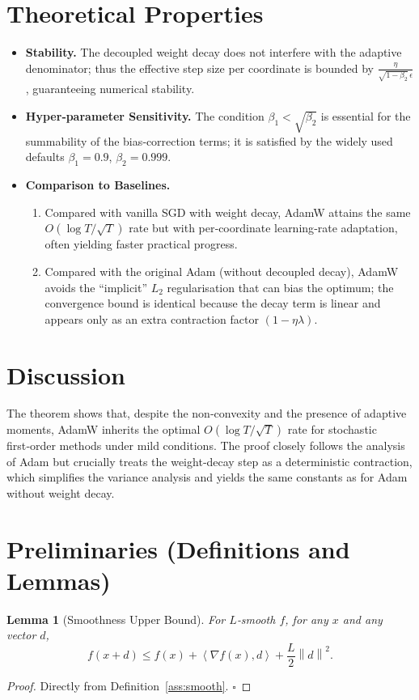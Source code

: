 \documentclass{article}
\newtheorem{lemma}{Lemma}
\newcommand{\norm}[1]{\left\|#1\right\|}
\newcommand{\ip}[2]{\left\langle #1,#2\right\rangle}
\begin{document}
\section*{Theoretical Properties}
\begin{itemize}[nosep]
\item \textbf{Stability.} The decoupled weight decay does not interfere with the adaptive denominator; thus the effective step size per coordinate is bounded by $\frac{\eta}{\sqrt{1-\beta_{2}}\,\epsilon}$, guaranteeing numerical stability.
\item \textbf{Hyper‑parameter Sensitivity.} The condition $\beta_{1}<\sqrt{\beta_{2}}$ is essential for the summability of the bias‑correction terms; it is satisfied by the widely used defaults $\beta_{1}=0.9$, $\beta_{2}=0.999$.
\item \textbf{Comparison to Baselines.}
    \begin{enumerate}[nosep]
        \item Compared with vanilla SGD with weight decay, AdamW attains the same $O(\log T/\sqrt{T})$ rate but with per‑coordinate learning‑rate adaptation, often yielding faster practical progress.
        \item Compared with the original Adam (without decoupled decay), AdamW avoids the “implicit” $L_{2}$ regularisation that can bias the optimum; the convergence bound is identical because the decay term is linear and appears only as an extra contraction factor $(1-\eta\lambda)$.
    \end{enumerate}
\end{itemize}
\section*{Discussion}
The theorem shows that, despite the non‑convexity and the presence of adaptive moments, AdamW inherits the optimal $O(\log T/\sqrt{T})$ rate for stochastic first‑order methods under mild conditions. The proof closely follows the analysis of Adam \cite{reddi2018convergence} but crucially treats the weight‑decay step as a deterministic contraction, which simplifies the variance analysis and yields the same constants as for Adam without weight decay.

\newpage
\section*{Preliminaries (Definitions and Lemmas)}
\begin{lemma}[Smoothness Upper Bound]\label{lem:smooth}
For $L$‑smooth $f$, for any $x$ and any vector $d$,
\[
f(x+d)\le f(x)+\ip{\nabla f(x)}{d}+\frac{L}{2}\norm{d}^{2}.
\]
\end{lemma}
\begin{proof}
Directly from Definition~\ref{ass:smooth}. \hfill $\square$
\end{proof}
\end{document}
